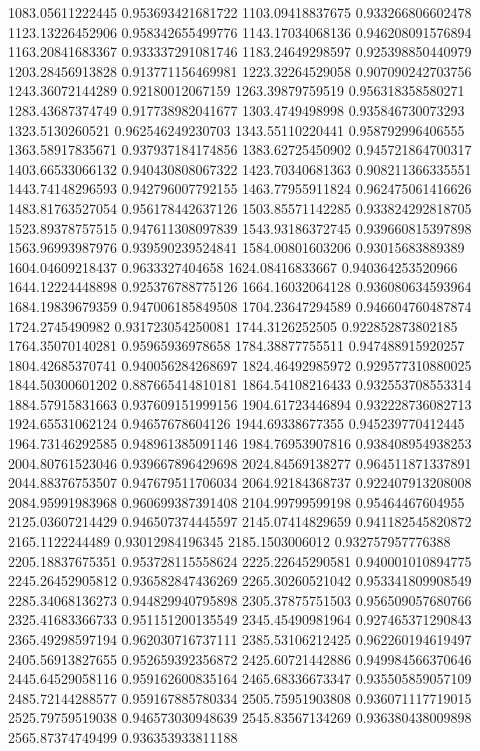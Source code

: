 {1083.05611222445 0.953693421681722
1103.09418837675 0.933266806602478
1123.13226452906 0.958342655499776
1143.17034068136 0.946208091576894
1163.20841683367 0.933337291081746
1183.24649298597 0.925398850440979
1203.28456913828 0.913771156469981
1223.32264529058 0.907090242703756
1243.36072144289 0.92180012067159
1263.39879759519 0.956318358580271
1283.43687374749 0.917738982041677
1303.4749498998 0.935846730073293
1323.5130260521 0.962546249230703
1343.55110220441 0.958792996406555
1363.58917835671 0.937937184174856
1383.62725450902 0.945721864700317
1403.66533066132 0.940430808067322
1423.70340681363 0.908211366335551
1443.74148296593 0.942796007792155
1463.77955911824 0.962475061416626
1483.81763527054 0.956178442637126
1503.85571142285 0.933824292818705
1523.89378757515 0.947611308097839
1543.93186372745 0.939660815397898
1563.96993987976 0.939590239524841
1584.00801603206 0.93015683889389
1604.04609218437 0.9633327404658
1624.08416833667 0.940364253520966
1644.12224448898 0.925376788775126
1664.16032064128 0.936080634593964
1684.19839679359 0.947006185849508
1704.23647294589 0.946604760487874
1724.2745490982 0.931723054250081
1744.3126252505 0.922852873802185
1764.35070140281 0.95965936978658
1784.38877755511 0.947488915920257
1804.42685370741 0.940056284268697
1824.46492985972 0.929577310880025
1844.50300601202 0.887665414810181
1864.54108216433 0.932553708553314
1884.57915831663 0.937609151999156
1904.61723446894 0.932228736082713
1924.65531062124 0.94657678604126
1944.69338677355 0.945239770412445
1964.73146292585 0.948961385091146
1984.76953907816 0.938408954938253
2004.80761523046 0.939667896429698
2024.84569138277 0.964511871337891
2044.88376753507 0.947679511706034
2064.92184368737 0.922407913208008
2084.95991983968 0.960699387391408
2104.99799599198 0.95464467604955
2125.03607214429 0.946507374445597
2145.07414829659 0.941182545820872
2165.1122244489 0.93012984196345
2185.1503006012 0.932757957776388
2205.18837675351 0.953728115558624
2225.22645290581 0.940001010894775
2245.26452905812 0.936582847436269
2265.30260521042 0.953341809908549
2285.34068136273 0.944829940795898
2305.37875751503 0.956509057680766
2325.41683366733 0.951151200135549
2345.45490981964 0.927465371290843
2365.49298597194 0.962030716737111
2385.53106212425 0.962260194619497
2405.56913827655 0.952659392356872
2425.60721442886 0.949984566370646
2445.64529058116 0.959162600835164
2465.68336673347 0.935505859057109
2485.72144288577 0.959167885780334
2505.75951903808 0.936071117719015
2525.79759519038 0.946573030948639
2545.83567134269 0.936380438009898
2565.87374749499 0.936353933811188
}
